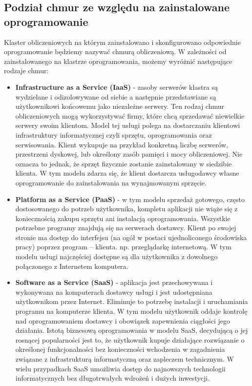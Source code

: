 \documentclass[10pt,a4paper,titlepage,twoside]{report}
\begin{document}
\subsection{Podział chmur ze względu na zainstalowane oprogramowanie}\indent \indent Klaster obliczeniowych na którym zainstalowano i skonfigurowano odpowiednie oprogramowanie będziemy nazywać chmurą obliczeniową. W zależności od zainstalowanego na klastrze oprogramowania, możemy wyróżnić następujące rodzaje chmur\cite{ad6}:
\begin{itemize}
	\item \textbf{Infrastructure as a Service (IaaS)} - zasoby serwerów klastra są wydzielane i odizolowywane od siebie a następnie przedstawiane są użytkownikowi końcowemu jako niezależne serwery. Ten rodzaj chmur obliczeniowych mogą wykorzystywać firmy, które chcą sprzedawać niewielkie serwery swoim klientom. Model tej usługi polega na dostarczaniu klientowi infrastruktury informatycznej czyli sprzętu, oprogramowania oraz serwisowania. Klient wykupuje na przykład konkretną liczbę serwerów, przestrzeni dyskowej, lub określony zasób pamięci i mocy obliczeniowej. Nie oznacza to jednak, że sprzęt fizycznie zostanie zainstalowany w siedzibie klienta\cite{ad7}. W tym modelu zdarza się, że klient dostarcza usługodawcy własne oprogramowanie do zainstalowania na wynajmowanym sprzęcie.
	\item \textbf{Platform as a Service (PaaS)} - w tym modelu sprzedaż gotowego, często dostosowanego do potrzeb użytkownika, kompletu aplikacji nie wiąże się z koniecznością zakupu sprzętu ani instalacją oprogramowania. Wszystkie potrzebne programy znajdują się na serwerach dostawcy\cite{ad9}. Klient po swojej stronie ma dostęp do interfejsu (na ogół w postaci ujednoliconego środowiska pracy) poprzez program – klienta. np. przeglądarkę internetową. W tym modelu usługi najczęściej dostępne są dla użytkownika z dowolnego połączonego z Internetem komputera.
	\item \textbf{Software as a Service (SaaS)} - aplikacja jest przechowywana i wykonywana na komputerach dostawcy usługi i jest udostępniana użytkownikom przez Internet. Eliminuje to potrzebę instalacji i uruchamiania programu na komputerze klienta. W tym modelu użytkownik oddaje kontrolę nad oprogramowaniem dostawcy i obowiązek zapewnienia ciągłości jego działania. Istotą biznesową oprogramowania w modelu SaaS, decydującą o jej rosnącej popularności jest to, że użytkownik kupuje działające rozwiązanie o określonej funkcjonalności bez konieczności wchodzenia w zagadnienia związane z infrastrukturą informatyczną oraz zapleczem technicznym. W wielu przypadkach SaaS umożliwia dostęp do najnowszych technologii informatycznych bez długotrwałych wdrożeń i dużych inwestycji\cite{ad8}.

\end{itemize}
\end{document}

